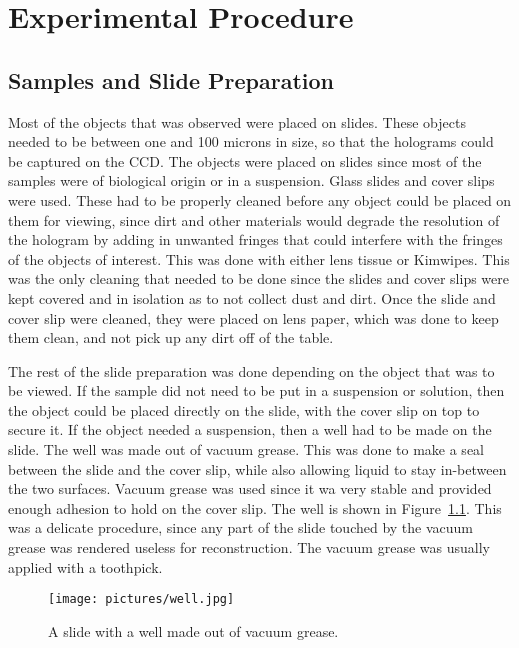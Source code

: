 %

%

\chapter{Experimental Procedure} \label{chap:Experimental}

\section{Samples and Slide Preparation}

Most of the objects that was observed were placed on slides. These objects
needed to be between one and 100 microns in size, so that the holograms could
be captured on the CCD\@. The objects were placed on slides
since most of the samples were of biological origin or in a suspension. Glass slides and
cover slips were used. These had to be properly cleaned before any object could
be placed on them for viewing, since dirt and other materials would degrade the
resolution of the hologram by adding in unwanted fringes that could interfere
with the fringes of the objects of interest. This was done with either lens tissue or Kimwipes.
This was the only cleaning that needed to be done since the slides and cover
slips were kept covered and in isolation as to not collect dust and dirt.
Once the slide and cover slip were cleaned, they
were placed on lens paper, which was done to keep them clean, and not pick up
any dirt off of the table.

The rest of the slide preparation was done depending on the object that was to be
viewed. If the sample did not need to be put in a suspension or solution, then
the object could be placed directly on the slide, with the cover slip on top to
secure it.
If the object needed a suspension, then a well had to be made on the slide. The
well was made out of vacuum grease. This was done to make a seal between the
slide and the cover slip, while also allowing liquid to stay in-between the two
surfaces. Vacuum grease was used since it wa very stable and provided enough
adhesion to hold on the cover slip.
The well is shown in Figure~\ref{fig:well}.
This was a delicate procedure, since any part of the slide touched by the
vacuum grease was rendered useless for reconstruction. The vacuum
grease was usually applied with a toothpick.

\begin{figure}[htbp!]
\begin{center}
    \texttt{[image: pictures/well.jpg]}
\end{center}
\caption{A slide with a well made out of vacuum grease.}
\label{fig:well}
\end{figure}

